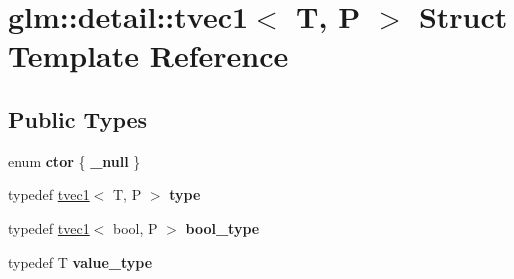 \hypertarget{structglm_1_1detail_1_1tvec1}{}\section{glm\+:\+:detail\+:\+:tvec1$<$ T, P $>$ Struct Template Reference}
\label{structglm_1_1detail_1_1tvec1}
\subsection*{Public Types}
\begin{DoxyCompactItemize}
\item 
enum {\bfseries ctor} \{ {\bfseries \+\_\+null}
 \}\hypertarget{structglm_1_1detail_1_1tvec1_a33f1783ca537d8dad5624e5adcf6bd5a}{}\label{structglm_1_1detail_1_1tvec1_a33f1783ca537d8dad5624e5adcf6bd5a}

\item 
typedef \hyperlink{structglm_1_1detail_1_1tvec1}{tvec1}$<$ T, P $>$ {\bfseries type}\hypertarget{structglm_1_1detail_1_1tvec1_aaf46d49a966e6d66f8f9c6beb5a33afe}{}\label{structglm_1_1detail_1_1tvec1_aaf46d49a966e6d66f8f9c6beb5a33afe}

\item 
typedef \hyperlink{structglm_1_1detail_1_1tvec1}{tvec1}$<$ bool, P $>$ {\bfseries bool\+\_\+type}\hypertarget{structglm_1_1detail_1_1tvec1_a9d5cbfb22c5b204382bede6efb1e96a2}{}\label{structglm_1_1detail_1_1tvec1_a9d5cbfb22c5b204382bede6efb1e96a2}

\item 
typedef T {\bfseries value\+\_\+type}\hypertarget{structglm_1_1detail_1_1tvec1_ac69856e6aa1e97517e1edabc836a9c1a}{}\label{structglm_1_1detail_1_1tvec1_ac69856e6aa1e97517e1edabc836a9c1a}

\end{DoxyCompactItemize}
